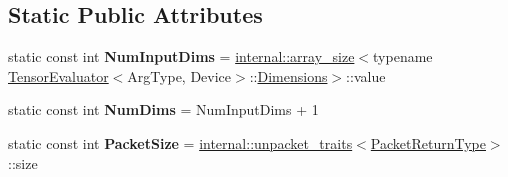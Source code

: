 \subsection*{Static Public Attributes}
\begin{DoxyCompactItemize}
\item 
\mbox{\label{struct_eigen_1_1_tensor_evaluator_3_01const_01_tensor_volume_patch_op_3_01_planes_00_01_rows_00_7868d50e868058a145e213ecbb5a830e_ada8dd0d38a0f6b5b7e2c981d732accc4}} 
static const int {\bfseries Num\+Input\+Dims} = \hyperlink{struct_eigen_1_1internal_1_1array__size}{internal\+::array\+\_\+size}$<$typename \hyperlink{struct_eigen_1_1_tensor_evaluator}{Tensor\+Evaluator}$<$Arg\+Type, Device$>$\+::\hyperlink{struct_eigen_1_1_d_sizes}{Dimensions}$>$\+::value
\item 
\mbox{\label{struct_eigen_1_1_tensor_evaluator_3_01const_01_tensor_volume_patch_op_3_01_planes_00_01_rows_00_7868d50e868058a145e213ecbb5a830e_a04e3241083ca865d7848075eaa372c0a}} 
static const int {\bfseries Num\+Dims} = Num\+Input\+Dims + 1
\item 
\mbox{\label{struct_eigen_1_1_tensor_evaluator_3_01const_01_tensor_volume_patch_op_3_01_planes_00_01_rows_00_7868d50e868058a145e213ecbb5a830e_ababd13c5a74ab1776b8620df9f0dbf4f}} 
static const int {\bfseries Packet\+Size} = \hyperlink{struct_eigen_1_1internal_1_1unpacket__traits}{internal\+::unpacket\+\_\+traits}$<$\hyperlink{group___sparse_core___module}{Packet\+Return\+Type}$>$\+::size
\end{DoxyCompactItemize}
